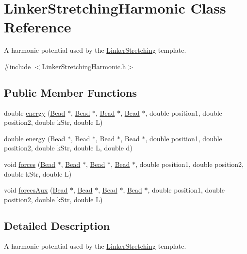 \hypertarget{classLinkerStretchingHarmonic}{\section{Linker\+Stretching\+Harmonic Class Reference}
\label{classLinkerStretchingHarmonic}
}


A harmonic potential used by the \hyperlink{classLinkerStretching}{Linker\+Stretching} template.  




{\ttfamily \#include $<$Linker\+Stretching\+Harmonic.\+h$>$}

\subsection*{Public Member Functions}
\begin{DoxyCompactItemize}
\item 
double \hyperlink{classLinkerStretchingHarmonic_a861ec8738ce83fbf558db2f7d92ae1d6}{energy} (\hyperlink{classBead}{Bead} $\ast$, \hyperlink{classBead}{Bead} $\ast$, \hyperlink{classBead}{Bead} $\ast$, \hyperlink{classBead}{Bead} $\ast$, double position1, double position2, double k\+Str, double L)
\item 
double \hyperlink{classLinkerStretchingHarmonic_ad6753b776badb213049cb74f15ff4799}{energy} (\hyperlink{classBead}{Bead} $\ast$, \hyperlink{classBead}{Bead} $\ast$, \hyperlink{classBead}{Bead} $\ast$, \hyperlink{classBead}{Bead} $\ast$, double position1, double position2, double k\+Str, double L, double d)
\item 
void \hyperlink{classLinkerStretchingHarmonic_ad10c1a3a8484baaffa47a5a6cc115019}{forces} (\hyperlink{classBead}{Bead} $\ast$, \hyperlink{classBead}{Bead} $\ast$, \hyperlink{classBead}{Bead} $\ast$, \hyperlink{classBead}{Bead} $\ast$, double position1, double position2, double k\+Str, double L)
\item 
void \hyperlink{classLinkerStretchingHarmonic_af212c767146c613bc45fb4eb6655e0b1}{forces\+Aux} (\hyperlink{classBead}{Bead} $\ast$, \hyperlink{classBead}{Bead} $\ast$, \hyperlink{classBead}{Bead} $\ast$, \hyperlink{classBead}{Bead} $\ast$, double position1, double position2, double k\+Str, double L)
\end{DoxyCompactItemize}


\subsection{Detailed Description}
A harmonic potential used by the \hyperlink{classLinkerStretching}{Linker\+Stretching} template. 

